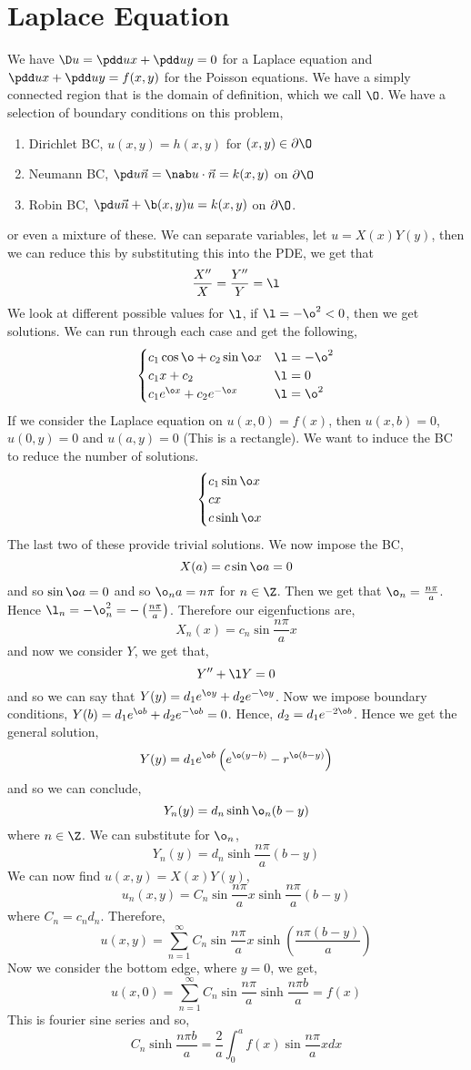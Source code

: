 \section{Laplace Equation}
We have $\D u = \pdd u x + \pdd u y = 0$ for a Laplace equation and $\pdd u x + \pdd u y = f(x, y)$ for the Poisson equations. We have a simply connected region that is the domain of definition, which we call $\O$. We have a selection of boundary conditions on this problem,
\begin{enumerate}
  \item Dirichlet BC, $u(x, y) = h(x, y)$ for $(x, y) \in \partial \O$
  \item Neumann BC, $\pd u {\vec n}  = \nab u \cdot \vec n = k(x, y)$ on $\partial \O$
  \item Robin BC, $\pd u {\vec n} + \b (x, y)u = k(x, y)$ on $\partial \O$.
\end{enumerate}
or even a mixture of these. We can separate variables, let $u = X(x)Y(y)$, then we can reduce this by substituting this into the PDE, we get that
$$ \frac{X''}{X} = \frac{Y''}{Y} = \l $$
We look at different possible values for $\l$, if $\l = - \o^2 < 0$, then we get solutions. We can run through each case and get the following,
$$ \begin{cases}
  c_1\cos \o + c_2\sin \o x & \l = -\o^2\\
  c_1x + c_2 & \l = 0\\
  c_1e^{\o x} + c_2e^{-\o x} & \l = \o^2
\end{cases} $$
If we consider the Laplace equation on $u(x, 0) = f(x)$, then $u(x, b) = 0$, $u(0, y) = 0$ and $u(a, y) = 0$ (This is a rectangle). We want to induce the BC to reduce the number of solutions.
$$ \begin{cases}
  c_1\sin \o x \\
  c x\\
  c\sinh \o x
\end{cases} $$
The last two of these provide trivial solutions. We now impose the BC,
$$ X(a) = c\sin \o a = 0 $$
and so $\sin \o a = 0$ and so $\o_n a = n\pi$ for $n \in \Z$. Then we get that $\o_n = \frac{n\pi}{a}$. Hence $\l_n = -\o_n^2 = -\left( \frac{n\pi}{a} \right)$. Therefore our eigenfuctions are,
$$ X_n(x) = c_n\sin \frac{n\pi}{a}x $$
and now we consider $Y$, we get that,
$$ Y'' + \l Y = 0 $$
and so we can say that $Y(y) = d_1e^{\o y} + d_2e^{-\o y}$. Now we impose boundary conditions, $Y(b) = d_1 e^{\o b} + d_2 e^{-\o b} = 0$. Hence, $d_2 = d_1e^{-2\o b}$. Hence we get the general solution,
$$ Y(y) = d_1 e^{\o b}\left( e^{\o (y - b)} - r^{\o(b - y)}\right) $$
and so we can conclude,
$$ Y_n(y) = d_n\sinh \o_n (b - y) $$
where $n \in \Z$. We can substitute for $\o_n$,
$$ Y_n(y) = d_n\sinh \frac{n\pi}{a}(b - y) $$
We can now find $u(x, y) = X(x)Y(y)$,
$$ u_n(x, y) = C_n \sin \frac{n\pi}{a}x\sinh \frac{n\pi}{a}(b - y) $$
where $C_n = c_nd_n$. Therefore,
$$ u(x, y) = \sum_{n=1}^\infty C_n\sin \frac{n\pi}{a}x\sinh \left( \frac{n\pi (b - y)}{a} \right) $$
Now we consider the bottom edge, where $y = 0$, we get,
$$ u(x, 0) = \sum_{n=1}^\infty C_n \sin \frac{n\pi }{a}\sinh \frac{n\pi b}{a} = f(x)$$
This is fourier sine series and so,
$$ C_n\sinh \frac{n\pi b}{a} = \frac{2}{a}\int_0^a f(x)\sin \frac{n\pi}{a}xdx $$

